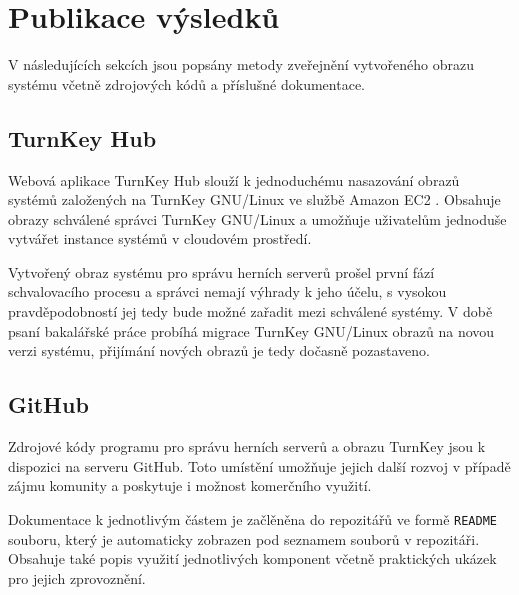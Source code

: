 \chapter{Publikace výsledků}

V následujících sekcích jsou popsány metody zveřejnění vytvořeného obrazu systému včetně zdrojových kódů
a příslušné dokumentace.

\section{TurnKey Hub}

Webová aplikace TurnKey Hub \cite{turnkey_hub} slouží k jednoduchému nasazování obrazů systémů založených na TurnKey GNU/Linux ve službě Amazon EC2 \cite{amazon}.
Obsahuje obrazy schválené správci TurnKey GNU/Linux a umožňuje uživatelům jednoduše vytvářet instance systémů v cloudovém prostředí.

Vytvořený obraz systému pro správu herních serverů prošel první fází schvalovacího procesu a správci nemají výhrady k jeho účelu, s vysokou pravděpodobností
jej tedy bude možné zařadit mezi schválené systémy.
V době psaní bakalářské práce probíhá migrace TurnKey GNU/Linux obrazů na novou verzi systému, přijímání nových obrazů je tedy dočasně pozastaveno.

\section{GitHub}

Zdrojové kódy programu pro správu herních serverů \cite{github_linux_gameservers} a obrazu TurnKey \cite{github_turnkey_gameserver}
jsou k dispozici na serveru GitHub. Toto umístění umožňuje jejich další rozvoj v případě zájmu komunity a poskytuje i
možnost komerčního využití.

Dokumentace k jednotlivým částem je začlěněna do repozitářů ve formě \texttt{README} souboru, který je automaticky zobrazen
pod seznamem souborů v repozitáři. Obsahuje také popis využití jednotlivých komponent včetně praktických ukázek pro jejich zprovoznění.
